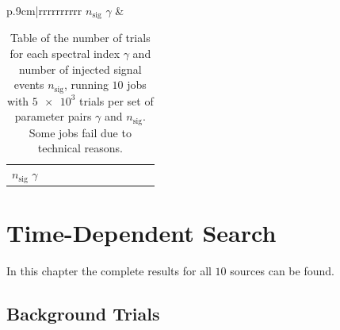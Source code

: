 \begin{table}
  \caption{Table of the number of trials for each spectral index $\gamma$ and number of injected signal events $n_\text{sig}$, running $\num{10}$ jobs with $\num{5e3}$ trials per set of parameter pairs $\gamma$ and $n_\text{sig}$. Some jobs fail due to technical reasons.}
  \label{tab:trials_sig_time_int_table}
  \begin{subtable}{\linewidth}
  \centering
  \begin{tabular}{p{.9cm}|rrrrrrrrrr}
    \toprule
    \: $n_\text{sig}$ \newline $\gamma$ \: & 
    \toprule
    
    \toprule
  \end{tabular}
\end{subtable}
\begin{subtable}{\linewidth}
\centering
  \begin{tabular}{p{.9cm}|rrrrrrrrrr}
    \toprule
    \: $n_\text{sig}$ \newline $\gamma$ \: & 
    \toprule
    
    \toprule
  \end{tabular}
  \end{subtable}
\end{table}

\section{Time-Dependent Search} \label{sec:time_dep_search_appendix}

In this chapter the complete results for all $\num{10}$ sources can be found.

\subsection{Background Trials}


